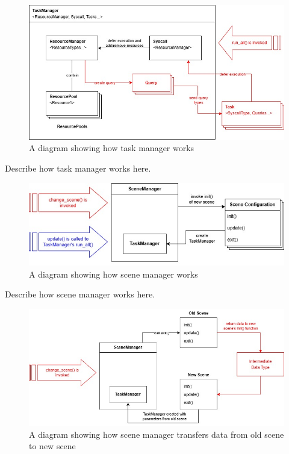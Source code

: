 \begin{figure}[h]
    \centering
    \includegraphics[width=\columnwidth, keepaspectratio]{images/taskmanager}
    \caption{A diagram showing how task manager works}
    \label{fig:taskmanager}
\end{figure}

\vspace{0.5cm}

Describe how task manager works here.

\vspace{0.5cm}

\begin{figure}[h]
    \centering
    \includegraphics[width=\columnwidth, keepaspectratio]{images/scenemanager}
    \caption{A diagram showing how scene manager works}
    \label{fig:scenemanager}
\end{figure}

\vspace{0.5cm}

\noindent Describe how scene manager works here.

\vspace{0.5cm}

\begin{figure}[h]
    \centering
    \includegraphics[width=\columnwidth, keepaspectratio]{images/scenemanager2}
    \caption{A diagram showing how scene manager transfers data from old scene to new scene}
    \label{fig:scenemanager2}
\end{figure}

